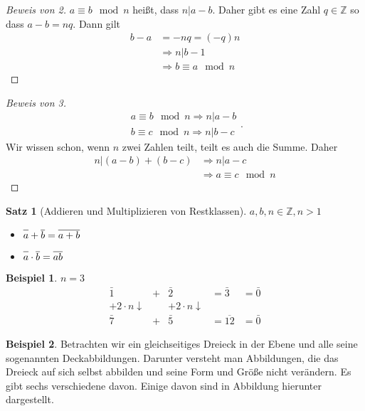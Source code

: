 \documentclass{article}
\theoremstyle{definition}
\newtheorem*{bei*}{Beispiel}
\theoremstyle{plain}
\newtheorem{sa}[definition]{Satz}
\begin{document}
\begin{proof}[Beweis von 2] 
	$ a \equiv b \mod n $ hei\ss t, dass $ n | a-b $. Daher gibt es eine Zahl $ q \in \mathbb{Z} $ so dass $ a - b = nq $. Dann gilt
	\begin{align*}
		b - a & = -nq = (-q)n \\
		& \Rightarrow n | b-1 \\
		& \Rightarrow \boxed{b \equiv a \mod n}
	\end{align*}
\end{proof}
\begin{proof}[Beweis von 3]
	\[ 
	\begin{array}{ll}
		a \equiv b \mod n \Rightarrow n | a-b \\
		b \equiv c \mod n \Rightarrow n | b-c
	\end{array}.
	 \]
	 Wir wissen schon, wenn $ n $ zwei Zahlen teilt, teilt es auch die Summe. Daher
	 \begin{align*}
	 	n | (a-b) + (b-c) & \Rightarrow n | a-c \\
	 	& \Rightarrow a \equiv c \mod n
	 \end{align*}
\end{proof}
\begin{sa}[Addieren und Multiplizieren von Restklassen]
	$ a,b,n \in \mathbb{Z}, n>1 $
	\begin{itemize}
		\item $ \overline{\vphantom{b}a} + \overline{b} = \overline{a+b} $
		\item $ \overline{\vphantom{b}a} \cdot \overline{b} = \overline{ab} $
	\end{itemize}
\end{sa}
\begin{bei*}
	$ n=3 $
	\[ 
	\begin{array}{rlrll}
		\bar{1} & + & \bar{2} & = \bar{3} & = \bar{0} \\
		+ 2 \cdot n\downarrow & & + 2 \cdot n \downarrow & & \\
		\bar{7} & + & \bar{5} & = \overline{12} & = \bar{0} 
	\end{array}
	 \]
\end{bei*}
\begin{bei*}
	Betrachten wir ein gleichseitiges Dreieck in der Ebene und alle seine sogenannten Deckabbildungen. Darunter versteht man Abbildungen, die das Dreieck auf sich selbst abbilden und seine Form 	und Gr\"o\ss e nicht ver\"andern. Es gibt sechs verschiedene davon. Einige davon sind in Abbildung hierunter dargestellt.
\end{bei*}
\end{document}
